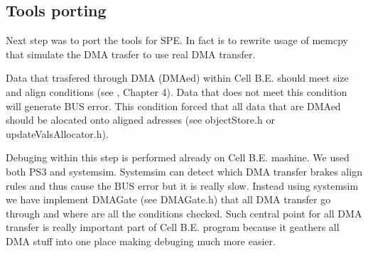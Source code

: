 \subsection{Tools porting}

\par
Next step was to port the tools for SPE.
In fact is to rewrite usage of memcpy that simulate the DMA trasfer to use real DMA transfer.

\par
Data that trasfered through DMA (DMAed) within Cell B.E. should meet size and align conditions (see \cite{programmersGuide}, Chapter 4).
Data that does not meet this condition will generate BUS error.
This condition forced that all data that are DMAed should be alocated onto aligned adresses (see objectStore.h or updateValsAllocator.h).

\par
Debuging within this step is performed already on Cell B.E. mashine.
We used both PS3 and systemsim.
Systemsim can detect which DMA transfer brakes align rules and thus cause the BUS error but it is really slow.
Instead using systemsim we have implement DMAGate (see DMAGate.h) that all DMA transfer go through and where are all the conditions checked.
Such central point for all DMA transfer is really important part of Cell B.E. program because it geathers all DMA stuff into one place making debuging much more easier.
